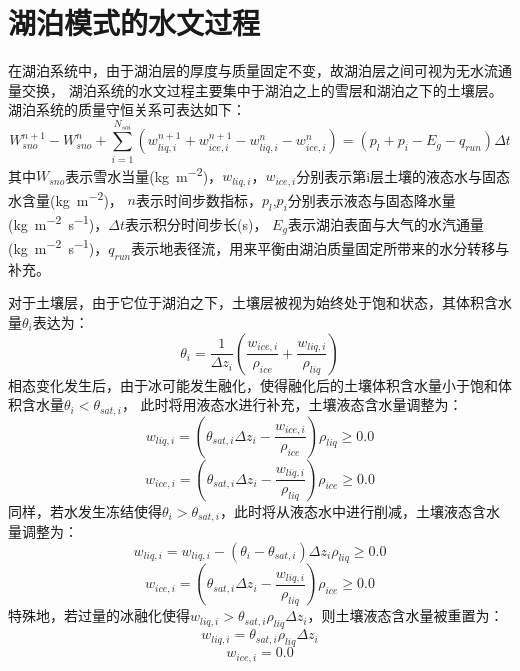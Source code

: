 \section{湖泊模式的水文过程}
在湖泊系统中，由于湖泊层的厚度与质量固定不变，故湖泊层之间可视为无水流通量交换，
湖泊系统的水文过程主要集中于湖泊之上的雪层和湖泊之下的土壤层。
湖泊系统的质量守恒关系可表达如下：
\begin{equation}
W_{sno}^{n+1}-W_{sno}^{n}+\sum_{i=1}^{N_{s o i}}\left(w_{liq, i}^{n+1}+w_{ice, i}^{n+1}-w_{liq, i}^{n}-w_{ice, i}^{n}\right)=\left(p_{l}+p_{i}-E_{g}-q_{r u n}\right) \Delta t
\end{equation}
其中$W_{sno}$表示雪水当量(\unit{kg.m^{-2}})，$w_{liq,i}$，$w_{ice,i}$分别表示第i层土壤的液态水与固态水含量(\unit{kg.m^{-2}})，
$n$表示时间步数指标，$p_l$,$p_i$分别表示液态与固态降水量(\unit{kg.m^{-2}.s^{-1}})，$\Delta t$表示积分时间步长(s)，
$E_g$表示湖泊表面与大气的水汽通量(\unit{kg.m^{-2}.s^{-1}})，$q_{run}$表示地表径流，用来平衡由湖泊质量固定所带来的水分转移与补充。


对于土壤层，由于它位于湖泊之下，土壤层被视为始终处于饱和状态，其体积含水量$\theta_i$表达为：
\begin{equation}
\theta_{i}=\frac{1}{\Delta z_{i}}\left(\frac{w_{ice, i}}{\rho_{ice}}+\frac{w_{liq, i}}{\rho_{liq}}\right)
\end{equation}
相态变化发生后，由于冰可能发生融化，使得融化后的土壤体积含水量小于饱和体积含水量$\theta_i<\theta_{sat,i}$，
此时将用液态水进行补充，土壤液态含水量调整为：
\begin{equation}
w_{liq, i}=\left(\theta_{sat,i} \Delta z_{i}-\frac{w_{ice, i}}{\rho_{ice}}\right) \rho_{liq} \geq 0.0
\end{equation}
\begin{equation}
w_{ice, i}=\left(\theta_{sat,i} \Delta z_{i}-\frac{w_{liq, i}}{\rho_{liq}}\right) \rho_{ice} \geq 0.0
\end{equation}
同样，若水发生冻结使得$\theta_i>\theta_{sat,i}$，此时将从液态水中进行削减，土壤液态含水量调整为：
\begin{equation}
w_{liq, i}=w_{liq, i}-\left(\theta_{i}-\theta_{sat,i}\right) \Delta z_{i} \rho_{liq} \geq 0.0
\end{equation}
\begin{equation}
w_{ice, i}=\left(\theta_{sat,i} \Delta z_{i}-\frac{w_{liq, i}}{\rho_{liq}}\right) \rho_{ice} \geq 0.0
\end{equation}
特殊地，若过量的冰融化使得$w_{liq,i}>\theta_{sat,i}\rho_{liq}\Delta z_i$，则土壤液态含水量被重置为：
\begin{equation}
w_{liq, i}=\theta_{sat,i} \rho_{liq} \Delta z_{i}
\end{equation}
\begin{equation}
w_{ice, i}=0.0
\end{equation}

